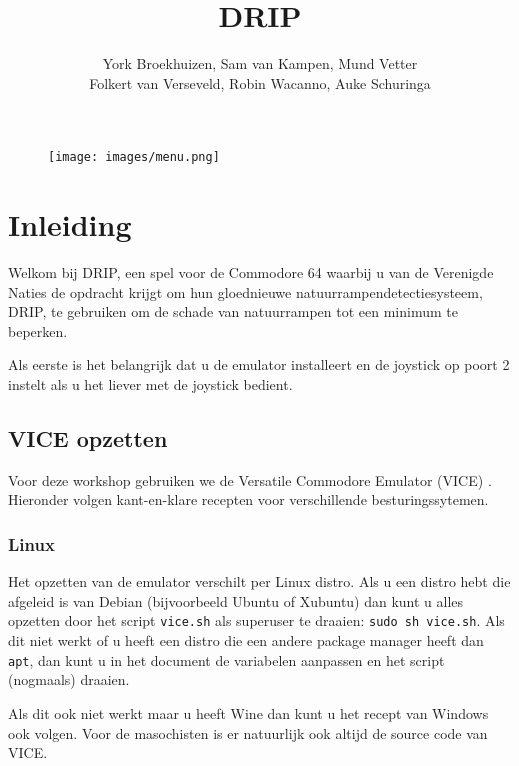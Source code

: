 \documentclass{article}
\title{DRIP}
\author{York Broekhuizen, Sam van Kampen, Mund Vetter \\ Folkert van Verseveld, Robin Wacanno, Auke Schuringa}
\begin{document}
\maketitle



\begin{figure}[H]
\centering
\texttt{[image: images/menu.png]}
\label{fig:drip}
\end{figure}

\newpage

\section{Inleiding}

Welkom bij DRIP, een spel voor de Commodore 64 waarbij u van de Verenigde Naties de opdracht krijgt om hun gloednieuwe natuurrampendetectiesysteem, DRIP, te gebruiken om de schade van natuurrampen tot een minimum te beperken.

Als eerste is het belangrijk dat u de emulator installeert en de joystick op poort 2 instelt als u het liever met de joystick bedient.


\subsection{VICE opzetten}
Voor deze workshop gebruiken we de Versatile Commodore Emulator (VICE) \citep{vice}. Hieronder volgen kant-en-klare recepten voor verschillende besturingssytemen.

\subsubsection{Linux}
Het opzetten van de emulator verschilt per Linux distro.
Als u een distro hebt die afgeleid is van Debian (bijvoorbeeld Ubuntu of Xubuntu) dan kunt u alles opzetten door het script \verb:vice.sh: \citep{vicescript} als superuser te draaien:
\verb:sudo sh vice.sh:.
Als dit niet werkt of u heeft een distro die een andere package manager heeft dan \verb:apt:, dan kunt u in het document de variabelen aanpassen en het script (nogmaals) draaien.

Als dit ook niet werkt maar u heeft Wine dan kunt u het recept van Windows ook volgen.
Voor de masochisten is er natuurlijk ook altijd de source code \citep{vicesourcelinux} van VICE.
\end{document}
